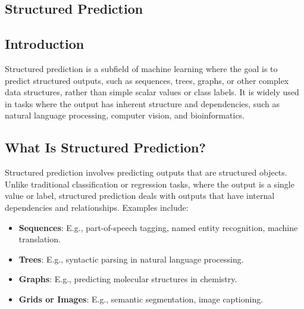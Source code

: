 \begin{notechapter}
\chapter{Structured Prediction}\label{ch:structured-prediction}

\section{Introduction}
Structured prediction is a subfield of machine learning where the goal 
is to predict structured outputs, such as sequences, trees, graphs, or 
other complex data structures, rather than simple scalar values or 
class labels. It is widely used in tasks where the output has inherent 
structure and dependencies, such as natural language processing, 
computer vision, and bioinformatics.

\section{What Is Structured Prediction?}
Structured prediction involves predicting outputs that are structured 
objects. Unlike traditional classification or regression tasks, where 
the output is a single value or label, structured prediction deals 
with outputs that have internal dependencies and relationships. 
Examples include:
\begin{itemize}
  \item \textbf{Sequences}: E.g., part-of-speech tagging, named entity 
    recognition, machine translation.
  \item \textbf{Trees}: E.g., syntactic parsing in natural language 
    processing.
  \item \textbf{Graphs}: E.g., predicting molecular structures in 
    chemistry.
  \item \textbf{Grids or Images}: E.g., semantic segmentation, image 
    captioning.
\end{itemize}


\end{notechapter}
